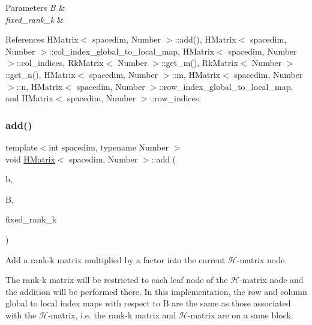 \begin{DoxyParams}{Parameters}
{\em B} & \\
\hline
{\em fixed\+\_\+rank\+\_\+k} & \\
\hline
\end{DoxyParams}


References H\+Matrix$<$ spacedim, Number $>$\+::add(), H\+Matrix$<$ spacedim, Number $>$\+::col\+\_\+index\+\_\+global\+\_\+to\+\_\+local\+\_\+map, H\+Matrix$<$ spacedim, Number $>$\+::col\+\_\+indices, Rk\+Matrix$<$ Number $>$\+::get\+\_\+m(), Rk\+Matrix$<$ Number $>$\+::get\+\_\+n(), H\+Matrix$<$ spacedim, Number $>$\+::m, H\+Matrix$<$ spacedim, Number $>$\+::n, H\+Matrix$<$ spacedim, Number $>$\+::row\+\_\+index\+\_\+global\+\_\+to\+\_\+local\+\_\+map, and H\+Matrix$<$ spacedim, Number $>$\+::row\+\_\+indices.

\mbox{\label{classHMatrix_a94981e45b7d9aa0f2afae77d414f1c1a}} 
\subsubsection{\texorpdfstring{add()}{add()}\hspace{0.1cm}{\footnotesize\ttfamily [8/10]}}
{\footnotesize\ttfamily template$<$int spacedim, typename Number $>$ \\
void \hyperlink{classHMatrix}{H\+Matrix}$<$ spacedim, Number $>$\+::add (\begin{DoxyParamCaption}\item[{const Number}]{b,  }\item[{const \hyperlink{classRkMatrix}{Rk\+Matrix}$<$ Number $>$ \&}]{B,  }\item[{const \hyperlink{classHMatrix_a5ca8dc549783d38371a01ecd621ecb34}{size\+\_\+type}}]{fixed\+\_\+rank\+\_\+k }\end{DoxyParamCaption})}

Add a rank-\/k matrix multiplied by a factor into the current $\mathcal{H}$-\/matrix node.

The rank-\/k matrix will be restricted to each leaf node of the $\mathcal{H}$-\/matrix node and the addition will be performed there. In this implementation, the row and column global to local index maps with respect to {\ttfamily B} are the same as those associated with the $\mathcal{H}$-\/matrix, i.\+e. the rank-\/k matrix and $\mathcal{H}$-\/matrix are on a same block.


